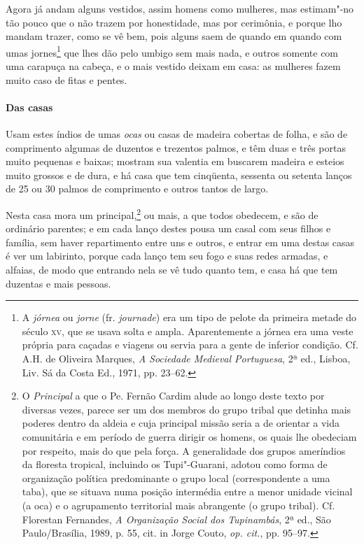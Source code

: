  Agora já andam alguns vestidos, assim homens como mulheres, mas
estimam"-no tão pouco que o não trazem por honestidade, mas por
cerimônia, e porque lho mandam trazer, como se vê bem, pois alguns
saem de quando em quando com umas jornes\footnote{ A \textit{jórnea} 
ou \textit{jorne} (fr. \textit{journade}) era um tipo
de pelote da primeira metade do século \textsc{xv}, que se usava solta e
ampla\textit{.} Aparentemente a jórnea era uma veste própria para
caçadas e viagens ou servia para a gente de inferior condição. Cf.
A.H. de Oliveira Marques, \textit{A Sociedade Medieval Portuguesa}, 2ª
ed., Lisboa, Liv. Sá da Costa Ed., 1971, pp. 23--62.} que lhes dão pelo
umbigo sem mais nada, e outros somente com uma carapuça na cabeça, e o
mais vestido deixam em casa: as mulheres fazem muito caso de fitas e pentes.

\paragraph{Das casas}

Usam estes índios de umas \textit{ocas} ou casas de madeira
cobertas de folha, e são de comprimento algumas de duzentos e trezentos
palmos, e têm duas e três portas muito pequenas e baixas; mostram sua
valentia em buscarem madeira e esteios muito grossos e de dura, e há
casa que tem cinqüenta, sessenta ou setenta lanços de 25 ou 30 palmos
de comprimento e outros tantos de largo.
 
 Nesta casa mora um principal,\footnote{ O \textit{Principal} a que o
Pe. Fernão Cardim alude ao longo deste texto por diversas vezes, parece
ser um dos membros do grupo tribal que detinha mais poderes dentro da
aldeia e cuja principal missão seria a de orientar a vida comunitária e
em período de guerra dirigir os homens, os quais lhe obedeciam por
respeito, mais do que pela força. A generalidade dos grupos ameríndios
da floresta tropical, incluindo os Tupi"-Guarani, adotou como forma de
organização política predominante o grupo local (correspondente a uma
taba), que se situava numa posição intermédia entre a menor unidade
vicinal (a oca) e o agrupamento territorial mais abrangente (o grupo
tribal). Cf. Florestan Fernandes, \textit{A Organização Social dos
Tupinambás}, 2ª ed., São Paulo/Brasília, 1989, p. 55, cit. in Jorge
Couto, \textit{op. cit.}, pp. 95--97.} ou mais, a que todos obedecem, e
são de ordinário parentes; e em cada lanço destes pousa um casal com
seus filhos e família, sem haver repartimento entre uns e outros, e
entrar em uma destas casas é ver um labirinto, porque cada lanço tem
seu fogo e suas redes armadas, e alfaias, de modo que entrando nela se
vê tudo quanto tem, e casa há que tem duzentas e mais pessoas.

